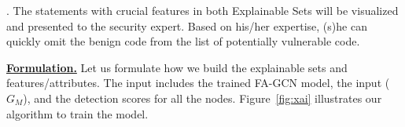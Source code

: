 .  The
statements with crucial features in both Explainable Sets will be
visualized and presented to the security expert. Based on his/her
expertise, (s)he can quickly omit the benign code from the list of
potentially vulnerable code.


   

\noindent \underline{\bf Formulation.}  Let us formulate how we build
the explainable sets and features/attributes. The input includes the
trained FA-GCN model, the input ($G_M$), and the detection scores for
all the nodes. Figure~\ref{fig:xai} illustrates our
algorithm to train the model.

